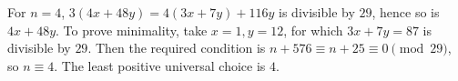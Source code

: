 For $n=4$, $3(4x+48y)=4(3x+7y)+116y$ is divisible by $29$, hence so is $4x+48y$. To prove minimality, take $x=1,y=12$, for which $3x+7y=87$ is divisible by $29$. Then the required condition is $n+576\equiv n+25\equiv0\pmod{29}$, so $n\equiv4$. The least positive universal choice is $\boxed4$.
